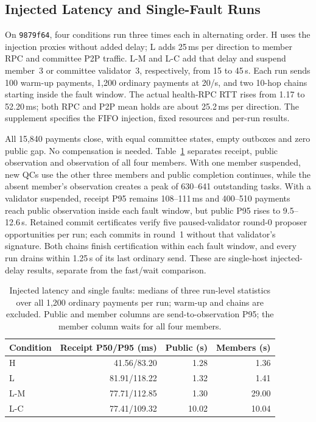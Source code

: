 \subsection{Injected Latency and Single-Fault Runs}
\label{sec:eval-faults}
On \texttt{9879f64}, four conditions run three times each in alternating
order. H uses the injection proxies without added delay; L adds 25\,ms
per direction to member RPC and committee P2P traffic. L-M and L-C
add that delay and suspend member~3 or committee validator~3,
respectively, from 15 to 45\,s. Each run sends 100 warm-up payments,
1,200 ordinary payments at 20/s, and two 10-hop chains starting inside
the fault window. The actual health-RPC RTT rises from 1.17 to
52.20\,ms; both RPC and P2P mean holds are about 25.2\,ms per direction.
The supplement specifies the FIFO injection, fixed resources and per-run results.

All 15,840 payments close, with equal committee states, empty outboxes
and zero public gap. No compensation is needed.
Table~\ref{tab:eval-faults} separates receipt, public observation and
observation of all four members. With one member suspended, new QCs
use the other three members and public completion continues, while
the absent member's observation creates a peak of 630--641 outstanding
tasks. With a validator suspended, receipt P95 remains 108--111\,ms
and 400--510 payments reach public observation inside each fault
window, but public P95 rises to 9.5--12.6\,s. Retained commit
certificates verify five paused-validator round-0 proposer opportunities
per run; each commits in round~1 without that validator's signature.
Both chains finish certification within each fault window, and every
run drains within 1.25\,s of its last ordinary send. These are
single-host injected-delay results, separate from the fast/wait comparison.

\begin{table}[t]
\caption{Injected latency and single faults: medians of three run-level
statistics over all 1,200 ordinary payments per run; warm-up and chains are excluded. Public and member columns are send-to-observation P95;
the member column waits for all four members.}
\label{tab:eval-faults}
\centering\small
\begin{tabular}{@{}lrrr@{}}
\toprule
Condition & Receipt P50/P95 (ms) & Public (s) & Members (s)\\
\midrule
H   & 41.56/83.20  & 1.28 & 1.36\\
L   & 81.91/118.22 & 1.32 & 1.41\\
L-M & 77.71/112.85 & 1.30 & 29.00\\
L-C & 77.41/109.32 & 10.02 & 10.04\\
\bottomrule
\end{tabular}
\end{table}
